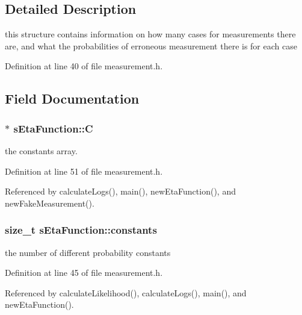 \subsection{\-Detailed \-Description}
this structure contains information on how many cases for measurements there are, and what the probabilities of erroneous measurement there is for each case 

\-Definition at line 40 of file measurement.\-h.



\subsection{\-Field \-Documentation}
\hypertarget{structsEtaFunction_a05c2f93c1148d5268d359d78540c10be}{
\subsubsection[{\-C}]{$\ast$ {\bf s\-Eta\-Function\-::\-C}}}\label{structsEtaFunction_a05c2f93c1148d5268d359d78540c10be}


the constants array. 



\-Definition at line 51 of file measurement.\-h.



\-Referenced by calculate\-Logs(), main(), new\-Eta\-Function(), and new\-Fake\-Measurement().

\hypertarget{structsEtaFunction_a1fdf63f3a73e7fd663491e72421619f9}{
\subsubsection[{constants}]{\setlength{\rightskip}{0pt plus 5cm}size\-\_\-t {\bf s\-Eta\-Function\-::constants}}}\label{structsEtaFunction_a1fdf63f3a73e7fd663491e72421619f9}


the number of different probability constants 



\-Definition at line 45 of file measurement.\-h.



\-Referenced by calculate\-Likelihood(), calculate\-Logs(), main(), and new\-Eta\-Function().

